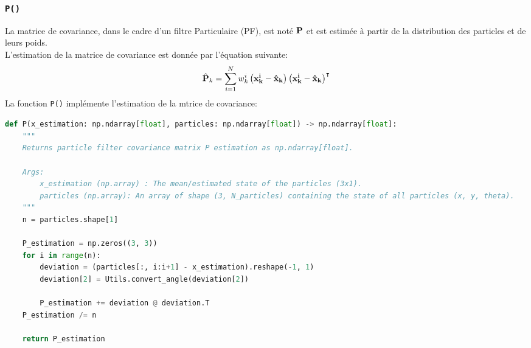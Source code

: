 \documentclass[../CSC_5RO12_TA_TP3.tex]{subfiles}
\begin{document}
\subsubsection{\texttt{P()}}
\begin{definition}
    La matrice de covariance, dans le cadre d'un filtre Particulaire (PF), est noté $\bf{P}$ et est estimée à partir de la distribution des particles et de leurs poids.\\

    \noindent L'estimation de la matrice de covariance est donnée par l'équation suivante:
    \begin{equation}
        \hat{\bf{P}}_{k} = \sum^{N}_{i=1} w^{i}_{k} \left(\bf{x}^{i}_{k} - \hat{\bf{x}}_{k}\right) \left(\bf{x}^{i}_{k} - \hat{\bf{x}}_{k}\right)^{\intercal}
    \end{equation}
    La fonction \texttt{P()} implémente l'estimation de la mtrice de covariance:
    \begin{scriptsize}\mycode
        \begin{lstlisting}[language=Python, caption=\texttt{P()}]
def P(x_estimation: np.ndarray[float], particles: np.ndarray[float]) -> np.ndarray[float]:
    """
    Returns particle filter covariance matrix P estimation as np.ndarray[float].

    Args:
        x_estimation (np.array) : The mean/estimated state of the particles (3x1).
        particles (np.array): An array of shape (3, N_particles) containing the state of all particles (x, y, theta).
    """
    n = particles.shape[1]

    P_estimation = np.zeros((3, 3))
    for i in range(n):
        deviation = (particles[:, i:i+1] - x_estimation).reshape(-1, 1)
        deviation[2] = Utils.convert_angle(deviation[2])

        P_estimation += deviation @ deviation.T
    P_estimation /= n

    return P_estimation
        \end{lstlisting}
    \end{scriptsize}
\end{definition}
\end{document}
